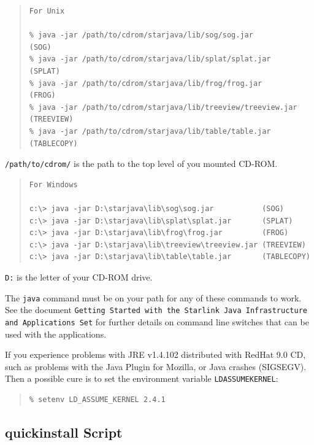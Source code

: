 \documentclass[twoside,11pt]{article}
\newcommand{\xref}[3]{#1}
\newcommand{\xlabel}[1]{}
\renewcommand{\_}{\texttt{\symbol{95}}}
\begin{document}
\begin{quote}
\begin{verbatim}
For Unix

% java -jar /path/to/cdrom/starjava/lib/sog/sog.jar           (SOG)
% java -jar /path/to/cdrom/starjava/lib/splat/splat.jar       (SPLAT)
% java -jar /path/to/cdrom/starjava/lib/frog/frog.jar         (FROG)
% java -jar /path/to/cdrom/starjava/lib/treeview/treeview.jar (TREEVIEW)
% java -jar /path/to/cdrom/starjava/lib/table/table.jar       (TABLECOPY)
\end{verbatim}
\end{quote}

\texttt{/path/to/cdrom/} is the path to the top level of you mounted CD-ROM.

\begin{quote}
\begin{verbatim}
For Windows

c:\> java -jar D:\starjava\lib\sog\sog.jar           (SOG)
c:\> java -jar D:\starjava\lib\splat\splat.jar       (SPLAT)
c:\> java -jar D:\starjava\lib\frog\frog.jar         (FROG)
c:\> java -jar D:\starjava\lib\treeview\treeview.jar (TREEVIEW)
c:\> java -jar D:\starjava\lib\table\table.jar       (TABLECOPY)
\end{verbatim}
\end{quote}
\texttt{D:} is the letter of your CD-ROM drive.

The \texttt{java} command must be on your path for any of these commands to work.
See the document \xref{}{sun251}{} \texttt{Getting Started with the Starlink
Java Infrastructure and Applications Set} for further details on command
line switches that can be used with the applications.

If you experience problems with JRE v1.4.1\_02 distributed with
RedHat 9.0 CD, such as problems with the Java Plugin for Mozilla,
or Java crashes (SIGSEGV). Then a possible cure is to set the
environment variable \texttt{LD\_ASSUME\_KERNEL}:

\begin{quote}
\begin{verbatim}
% setenv LD_ASSUME_KERNEL 2.4.1
\end{verbatim}
\end{quote}

\subsection{\xlabel{quickin}quick\_install Script}
\end{document}
